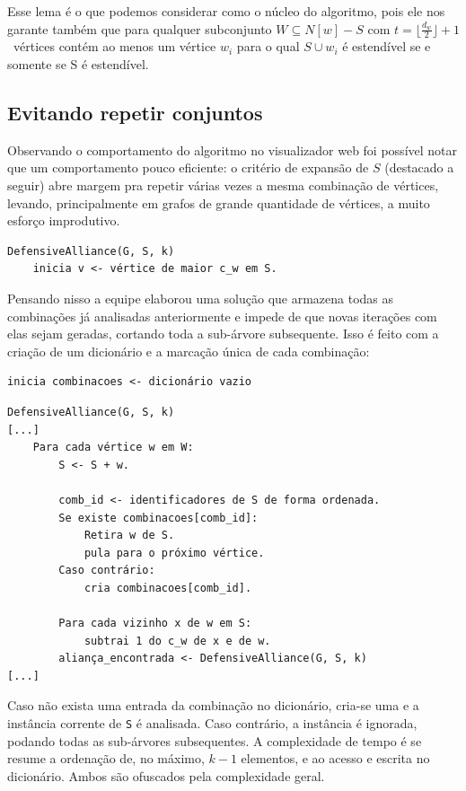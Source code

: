 Esse lema é o que podemos considerar como o núcleo do algoritmo, pois ele nos garante também que para qualquer subconjunto $W \subseteq N[w] - S$ com $t = \lfloor \frac{d_w}{2} \rfloor + 1$  vértices contém ao menos um vértice $w_i$ para o qual $S \cup {w_i}$ é estendível se e somente se S é estendível.

\subsection{Evitando repetir conjuntos}
Observando o comportamento do algoritmo no visualizador web foi possível notar que um comportamento pouco eficiente: o critério de expansão de $S$ (destacado a seguir) abre margem pra repetir várias vezes a mesma combinação de vértices, levando, principalmente em grafos de grande quantidade de vértices, a muito esforço improdutivo.

\begin{lstlisting}
DefensiveAlliance(G, S, k)
	inicia v <- vértice de maior c_w em S.
\end{lstlisting}

Pensando nisso a equipe elaborou uma solução que armazena todas as combinações já analisadas anteriormente e impede de que novas iterações com elas sejam geradas, cortando toda a sub-árvore subsequente. Isso é feito com a criação de um dicionário e a marcação única de cada combinação:

\begin{lstlisting}
inicia combinacoes <- dicionário vazio
\end{lstlisting}

\begin{lstlisting}
DefensiveAlliance(G, S, k)
[...]
	Para cada vértice w em W:
		S <- S + w.
		
		comb_id <- identificadores de S de forma ordenada.
		Se existe combinacoes[comb_id]:
			Retira w de S.
			pula para o próximo vértice.
		Caso contrário:	
			cria combinacoes[comb_id].

		Para cada vizinho x de w em S:
			subtrai 1 do c_w de x e de w.
		aliança_encontrada <- DefensiveAlliance(G, S, k)
[...]
\end{lstlisting}

Caso não exista uma entrada da combinação no dicionário, cria-se uma e a instância corrente de \texttt{S} é analisada. Caso contrário, a instância é ignorada, podando todas as sub-árvores subsequentes. A complexidade de tempo é se resume a ordenação de, no máximo, $k-1$ elementos, e ao acesso e escrita no dicionário. Ambos são ofuscados pela complexidade geral.

